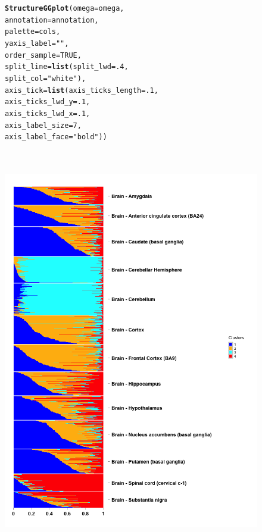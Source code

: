 \documentclass[12pt]{article}\usepackage[]{graphicx}\usepackage[usenames,dvipsnames]{color}
\makeatletter
\newcommand{\hlnum}[1]{\textcolor[rgb]{0.686,0.059,0.569}{#1}}%
\newcommand{\hlstr}[1]{\textcolor[rgb]{0.192,0.494,0.8}{#1}}%
\newcommand{\hlstd}[1]{\textcolor[rgb]{0.345,0.345,0.345}{#1}}%
\newcommand{\hlkwc}[1]{\textcolor[rgb]{0.333,0.667,0.333}{#1}}%
\newcommand{\hlkwd}[1]{\textcolor[rgb]{0.737,0.353,0.396}{\textbf{#1}}}%
\newenvironment{kframe}{%
 \def\at@end@of@kframe{}%
 \ifinner\ifhmode%
  \def\at@end@of@kframe{\end{minipage}}%
  \begin{minipage}{\columnwidth}%
 \fi\fi%
 \def\FrameCommand##1{\hskip\@totalleftmargin \hskip-\fboxsep
 \colorbox{shadecolor}{##1}\hskip-\fboxsep
     \hskip-\linewidth \hskip-\@totalleftmargin \hskip\columnwidth}%
 \MakeFramed {\advance\hsize-\width
   \@totalleftmargin\z@ \linewidth\hsize
   \@setminipage}}%
 {\par\unskip\endMakeFramed%
 \at@end@of@kframe}
\newenvironment{knitrout}{}{} %
\makeatother
\begin{document}
\begin{figure}[htp]
\begin{center}
\begin{knitrout}
\color{fgcolor}\begin{kframe}
\begin{alltt}
\hlkwd{StructureGGplot}\hlstd{(}\hlkwc{omega} \hlstd{= omega,}
                \hlkwc{annotation}\hlstd{= annotation,}
                \hlkwc{palette} \hlstd{= cols,}
                \hlkwc{yaxis_label} \hlstd{=} \hlstr{""}\hlstd{,}
                \hlkwc{order_sample} \hlstd{=} \hlnum{TRUE}\hlstd{,}
                \hlkwc{split_line} \hlstd{=} \hlkwd{list}\hlstd{(}\hlkwc{split_lwd} \hlstd{=} \hlnum{.4}\hlstd{,}
                                  \hlkwc{split_col} \hlstd{=} \hlstr{"white"}\hlstd{),}
                \hlkwc{axis_tick} \hlstd{=} \hlkwd{list}\hlstd{(}\hlkwc{axis_ticks_length} \hlstd{=} \hlnum{.1}\hlstd{,}
                                 \hlkwc{axis_ticks_lwd_y} \hlstd{=} \hlnum{.1}\hlstd{,}
                                 \hlkwc{axis_ticks_lwd_x} \hlstd{=} \hlnum{.1}\hlstd{,}
                                 \hlkwc{axis_label_size} \hlstd{=} \hlnum{7}\hlstd{,}
                                 \hlkwc{axis_label_face} \hlstd{=} \hlstr{"bold"}\hlstd{))}
\end{alltt}
\end{kframe}
\includegraphics[width=5in,height=7in]{figure/plot_topic_gtex-1} 

\end{knitrout}
\end{center}
\end{figure}
\end{document}
